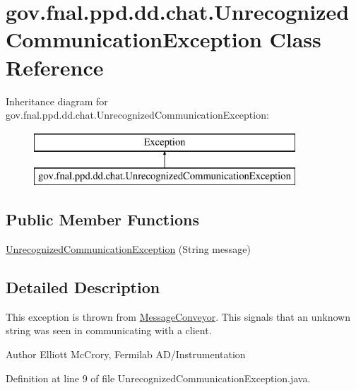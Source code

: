 \hypertarget{classgov_1_1fnal_1_1ppd_1_1dd_1_1chat_1_1UnrecognizedCommunicationException}{\section{gov.\-fnal.\-ppd.\-dd.\-chat.\-Unrecognized\-Communication\-Exception Class Reference}
\label{classgov_1_1fnal_1_1ppd_1_1dd_1_1chat_1_1UnrecognizedCommunicationException}
}
Inheritance diagram for gov.\-fnal.\-ppd.\-dd.\-chat.\-Unrecognized\-Communication\-Exception\-:\begin{figure}[H]
\begin{center}
\leavevmode
\includegraphics[height=2.000000cm]{classgov_1_1fnal_1_1ppd_1_1dd_1_1chat_1_1UnrecognizedCommunicationException}
\end{center}
\end{figure}
\subsection*{Public Member Functions}
\begin{DoxyCompactItemize}
\item 
\hyperlink{classgov_1_1fnal_1_1ppd_1_1dd_1_1chat_1_1UnrecognizedCommunicationException_a3f3699518a3863ec7f26d50de241a8ba}{Unrecognized\-Communication\-Exception} (String message)
\end{DoxyCompactItemize}


\subsection{Detailed Description}
This exception is thrown from \hyperlink{classgov_1_1fnal_1_1ppd_1_1dd_1_1chat_1_1MessageConveyor}{Message\-Conveyor}. This signals that an unknown string was seen in communicating with a client.

\begin{DoxyAuthor}{Author}
Elliott Mc\-Crory, Fermilab A\-D/\-Instrumentation 
\end{DoxyAuthor}


Definition at line 9 of file Unrecognized\-Communication\-Exception.\-java.



